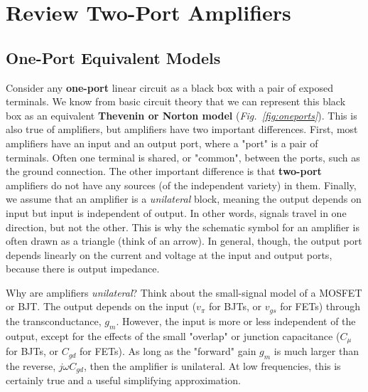 \section{Review Two-Port Amplifiers}
\subsection{One-Port Equivalent Models}
Consider any \textbf{one-port} linear circuit as a black box with a pair of exposed terminals.  We know from basic circuit theory that we can represent this black box as an equivalent \textbf{Thevenin or Norton model} (\emph{Fig.~\ref{fig:oneports}}).  This is also true of amplifiers, but amplifiers have two important differences.  First, most amplifiers have an input and an output port, where a "port" is a  pair of terminals.  Often one terminal is shared, or "common", between the ports, such as the ground connection.  The other important difference is that \textbf{two-port} amplifiers do not have any sources (of the independent variety) in them.  Finally, we assume that an amplifier is a \textit{unilateral} block, meaning the output depends on input but input is independent of output.  In other words, signals travel in one direction, but not the other.  This is why the schematic symbol for an amplifier is often drawn as a triangle (think of an arrow).  In general, though, the output port depends linearly on the current and voltage at the input and output ports, because there is output impedance.  

Why are amplifiers \textit{unilateral}?  Think about the small-signal model of a MOSFET or BJT.  The output depends on the input ($v_{\pi}$ for BJTs, or $v_{gs}$ for FETs) through the transconductance, $g_m$.  However, the input is more or less independent of the output, except for the effects of the small "overlap" or junction capacitance ($C_\mu$ for BJTs, or $C_{gd}$ for FETs).  As long as the "forward" gain $g_m$ is much larger than the reverse, $j\omega C_{gd}$, then the amplifier is unilateral.  At low frequencies, this is certainly true and a useful simplifying approximation.
